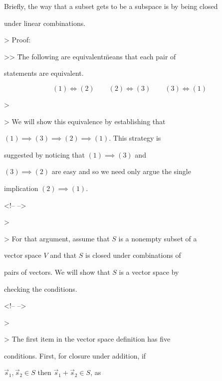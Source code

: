 Briefly, the way that a subset gets to be a subspace is by being closed

under linear combinations.



>   Proof:



    >>   \"The following are equivalent\" means that each pair of

        statements are equivalent.



$$(1)\!\iff\!(2)

\qquad

(2)\!\iff\!(3)

\qquad

(3)\!\iff\!(1)$$



>   



    >   We will show this equivalence by establishing that

        $(1)\implies (3)\implies (2)\implies (1)$. This strategy is

        suggested by noticing that $(1)\implies (3)$ and

        $(3)\implies (2)$ are easy and so we need only argue the single

        implication $(2)\implies (1)$.



<!-- -->



>   



    >   For that argument, assume that $S$ is a nonempty subset of a

        vector space $V$ and that $S$ is closed under combinations of

        pairs of vectors. We will show that $S$ is a vector space by

        checking the conditions.



<!-- -->



>   



    >   The first item in the vector space definition has five

        conditions. First, for closure under addition, if

        $\vec{s}_1,\vec{s}_2\in S$ then $\vec{s}_1+\vec{s}_2\in S$, as

